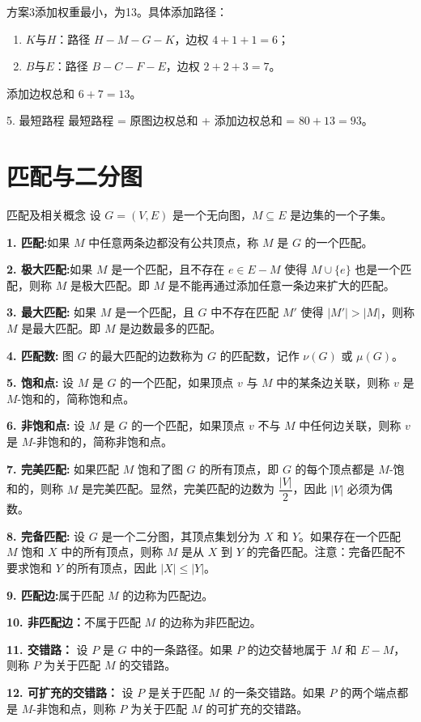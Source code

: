 方案3添加权重最小，为13。具体添加路径：
\begin{enumerate}
    \item $K$与$H$：路径 $H-M-G-K$，边权 $4+1+1=6$；
    \item $B$与$E$：路径 $B-C-F-E$，边权 $2+2+3=7$。
\end{enumerate}
添加边权总和 $6+7=13$。

5. 最短路程
最短路程 = 原图边权总和 + 添加边权总和 = $80 + 13 = 93$。
\newpage
\section{匹配与二分图}
\begin{definition}{匹配及相关概念}{}
设 $G=(V,E)$ 是一个无向图，$M \subseteq E$ 是边集的一个子集。

\textbf{1. 匹配:}如果 $M$ 中任意两条边都没有公共顶点，称 $M$ 是 $G$ 的一个匹配。

\textbf{2. 极大匹配:}如果 $M$ 是一个匹配，且不存在 $e \in E- M$ 使得 $M \cup \{e\}$ 也是一个匹配，则称 $M$ 是极大匹配。即 $M$ 是不能再通过添加任意一条边来扩大的匹配。

\textbf{3. 最大匹配:}
如果 $M$ 是一个匹配，且 $G$ 中不存在匹配 $M'$ 使得 $|M'| > |M|$，则称 $M$ 是最大匹配。即 $M$ 是边数最多的匹配。

\textbf{4. 匹配数:}
图 $G$ 的最大匹配的边数称为 $G$ 的匹配数，记作 $\nu(G)$ 或 $\mu(G)$。

\textbf{5. 饱和点:}
设 $M$ 是 $G$ 的一个匹配，如果顶点 $v$ 与 $M$ 中的某条边关联，则称 $v$ 是 $M$-饱和的，简称饱和点。

\textbf{6. 非饱和点:}
设 $M$ 是 $G$ 的一个匹配，如果顶点 $v$ 不与 $M$ 中任何边关联，则称 $v$ 是 $M$-非饱和的，简称非饱和点。

\textbf{7. 完美匹配:}
如果匹配 $M$ 饱和了图 $G$ 的所有顶点，即 $G$ 的每个顶点都是 $M$-饱和的，则称 $M$ 是完美匹配。显然，完美匹配的边数为 $\dfrac{|V|}2$，因此 $|V|$ 必须为偶数。

\textbf{8. 完备匹配:}
设 $G$ 是一个二分图，其顶点集划分为 $X$ 和 $Y$。如果存在一个匹配 $M$ 饱和 $X$ 中的所有顶点，则称 $M$ 是从 $X$ 到 $Y$ 的完备匹配。注意：完备匹配不要求饱和 $Y$ 的所有顶点，因此 $|X| \leqslant |Y|$。

\textbf{9. 匹配边:}属于匹配 $M$ 的边称为匹配边。

\textbf{10. 非匹配边：}不属于匹配 $M$ 的边称为非匹配边。

\textbf{11. 交错路：}
设 $P$ 是 $G$ 中的一条路径。如果 $P$ 的边交替地属于 $M$ 和 $E- M$，则称 $P$ 为关于匹配 $M$ 的交错路。

\textbf{12. 可扩充的交错路：}
设 $P$ 是关于匹配 $M$ 的一条交错路。如果 $P$ 的两个端点都是 $M$-非饱和点，则称 $P$ 为关于匹配 $M$ 的可扩充的交错路。
\end{definition}
